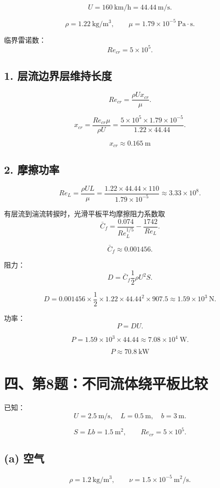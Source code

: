 \documentclass[11pt,a4paper]{ctexart}
\begin{document}
\[
U=160\ \mathrm{km/h}=44.44\ \mathrm{m/s}.
\]

\[
\rho=1.22\ \mathrm{kg/m^3},\qquad
\mu=1.79\times10^{-5}\ \mathrm{Pa\cdot s}.
\]

临界雷诺数：
\[
Re_{cr}=5\times10^5.
\]

\subsection*{1. 层流边界层维持长度}

\[
Re_{cr}=\frac{\rho Ux_{cr}}{\mu}.
\]

\[
x_{cr}=\frac{Re_{cr}\mu}{\rho U}
=\frac{5\times10^5\times1.79\times10^{-5}}
{1.22\times44.44}.
\]

\[
\boxed{x_{cr}\approx0.165\ \mathrm{m}}
\]

\subsection*{2. 摩擦功率}

\[
Re_L=\frac{\rho UL}{\mu}
=\frac{1.22\times44.44\times110}{1.79\times10^{-5}}
\approx3.33\times10^8.
\]

有层流到湍流转捩时，光滑平板平均摩擦阻力系数取
\[
\bar C_f=\frac{0.074}{Re_L^{1/5}}-\frac{1742}{Re_L}.
\]

\[
\bar C_f\approx0.001456.
\]

阻力：
\[
D=\bar C_f\frac12\rho U^2S.
\]

\[
D=0.001456\times\frac12\times1.22\times44.44^2\times907.5
\approx1.59\times10^3\ \mathrm{N}.
\]

功率：
\[
P=DU.
\]

\[
P=1.59\times10^3\times44.44\approx7.08\times10^4\ \mathrm{W}.
\]

\[
\boxed{P\approx70.8\ \mathrm{kW}}
\]

\section*{四、第8题：不同流体绕平板比较}

已知：
\[
U=2.5\ \mathrm{m/s},\quad L=0.5\ \mathrm{m},\quad b=3\ \mathrm{m}.
\]

\[
S=Lb=1.5\ \mathrm{m^2},\qquad Re_{cr}=5\times10^5.
\]

\subsection*{(a) 空气}

\[
\rho=1.2\ \mathrm{kg/m^3},\qquad
\nu=1.5\times10^{-5}\ \mathrm{m^2/s}.
\]
\end{document}
